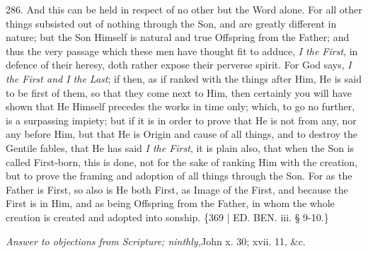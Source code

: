 286. And this
can be held in respect of no other but the Word alone. For all other
things subsisted out of nothing through the Son, and are greatly
different in nature; but the Son Himself is natural and true Offspring
from the Father; and thus the very passage which these men have
thought fit to adduce, \emph{I the First}, in defence of their heresy,
doth rather expose their perverse spirit. For God says, \emph{I the First
and I the Last}; if then, as if ranked with the things after Him,
He is said to be first of them, so that they come next to Him, then
certainly you will have shown that He Himself precedes the works in
time only; which, to go no further, is a surpassing impiety; but if it
is in order to prove that He is not from any, nor any before Him, but
that He is Origin and cause of all things, and to destroy the Gentile
fables, that He has said \emph{I the First}, it is plain also, that
when the Son is called First-born, this is done, not for the sake of
ranking Him with the creation, but to prove the framing and adoption
of all things through the Son. For as the Father is First, so also is
He both First, as Image of the First, and because the First is in Him,
and as being Offspring from the Father, in whom the whole creation is
created and adopted into sonship. \{369 | ED. BEN.
iii. § 9-10.\}


\emph{Answer to
objections from Scripture; ninthly,}John
x. 30; xvii. 11, \&c.

